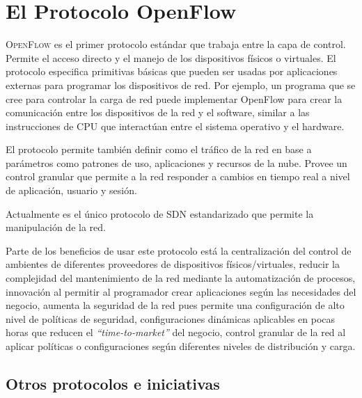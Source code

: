 \documentclass[10pt,journal,compsoc]{IEEEtran}
\begin{document}
\section{El Protocolo OpenFlow}
\textsc{OpenFlow} es el primer protocolo estándar que trabaja entre la capa de control. Permite el acceso directo y el manejo de los dispositivos físicos o virtuales. El protocolo especifica primitivas básicas que pueden ser usadas por aplicaciones externas para programar los dispositivos de  red. Por ejemplo, un programa que se cree para controlar la carga de red puede implementar OpenFlow para crear la comunicación entre los dispositivos de la red y el software, similar a las instrucciones de CPU que interactúan entre el sistema operativo y el hardware. 

El protocolo permite también definir como el tráfico de la red en base a parámetros como patrones de uso, aplicaciones y recursos de la nube. Provee un control granular que permite a la red responder a cambios en tiempo real a nivel de aplicación, usuario y sesión. 

Actualmente es el único protocolo de SDN estandarizado que permite la manipulación de la red.  

Parte de los beneficios de usar este protocolo está la centralización del control de ambientes de diferentes proveedores de dispositivos físicos/virtuales, reducir la complejidad del mantenimiento de la red mediante la automatización de procesos, innovación al permitir al programador crear aplicaciones según las necesidades del negocio, aumenta la seguridad de la red pues permite una configuración de alto nivel de políticas de seguridad, configuraciones dinámicas aplicables en pocas horas que reducen el \emph{``time-to-market''} del negocio, control granular de la red al aplicar políticas o configuraciones según diferentes niveles de distribución y carga.

\subsection{Otros protocolos e iniciativas}



\end{document}

